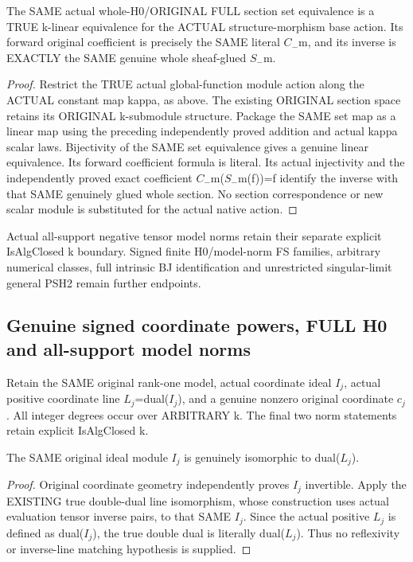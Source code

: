 \begin{theorem}
\label{thm:seven-native-negative-tensor-actual-linear-full-h0}
\leanok
The SAME actual whole-H0/ORIGINAL FULL section set equivalence is a
TRUE k-linear equivalence for the ACTUAL structure-morphism base action.
Its forward original coefficient is precisely the SAME literal $C_-$m,
and its inverse is EXACTLY the SAME genuine whole sheaf-glued $S_-$m.
\end{theorem}
\begin{proof}
Restrict the TRUE actual global-function module action along the ACTUAL
constant map kappa, as above. The existing ORIGINAL section space
retains its ORIGINAL k-submodule structure. Package the SAME set map
as a linear map using the preceding independently proved addition and
actual kappa scalar laws. Bijectivity of the SAME set equivalence gives
a genuine linear equivalence. Its forward coefficient formula is literal.
Its actual injectivity and the independently proved exact coefficient
$C_-$m($S_-$m(f))=f identify the inverse with that SAME genuinely glued
whole section. No section correspondence or new scalar module is
substituted for the actual native action.
\end{proof}

Actual all-support negative tensor model norms retain their separate
explicit IsAlgClosed k boundary. Signed finite H0/model-norm FS families,
arbitrary numerical classes, full intrinsic BJ identification and
unrestricted singular-limit general PSH2 remain further endpoints.

\subsection{Genuine signed coordinate powers, FULL H0 and all-support model norms}
Retain the SAME original rank-one model, actual coordinate ideal $I_j$,
actual positive coordinate line $L_j$=dual($I_j$), and a genuine nonzero
original coordinate $c_j$. All integer degrees occur over ARBITRARY k.
The final two norm statements retain explicit IsAlgClosed k.

\begin{theorem}
\label{thm:seven-native-coordinate-ideal-true-dual}
\leanok
The SAME original ideal module $I_j$ is genuinely isomorphic to dual($L_j$).
\end{theorem}
\begin{proof}
Original coordinate geometry independently proves $I_j$ invertible.
Apply the EXISTING true double-dual line isomorphism, whose construction
uses actual evaluation tensor inverse pairs, to that SAME $I_j$. Since
the actual positive $L_j$ is defined as dual($I_j$), the true double dual
is literally dual($L_j$). Thus no reflexivity or inverse-line matching
hypothesis is supplied.
\end{proof}

